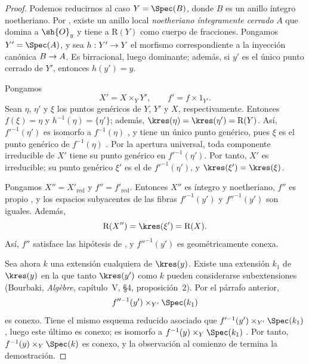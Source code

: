 \documentclass[oneside]{amsart}
\makeatletter
\newcommand{\ega@arrow}[2]{\mathchoice{#1}{#2}{#2}{#2}}
\renewcommand{\to}{\ega@arrow{\longrightarrow}{\rightarrow}}
\newcommand{\oldpage}[2][]{{\marginnote{\normalfont\textbf{#1}~|~#2}}\ignorespaces}
\makeatother
\begin{document}
\begin{proof}
Podemos reducirnos al caso $Y=\Spec(B)$, donde $B$ es un anillo
íntegro noetheriano. Por , existe un anillo local
\emph{noetheriano íntegramente cerrado} $A$ que domina a $\sh{O}_y$ y tiene a
$\mathrm{R}(Y)$ como cuerpo de fracciones. Pongamos $Y'=\Spec(A)$, y
sea $h:Y'\to Y$ el morfismo correspondiente a la inyección canónica
$B\to A$. Es birracional, luego dominante; además, si $y'$ es el
único punto cerrado de $Y'$, entonces $h(y')=y$.

Pongamos
\[
  X'=X\times_Y Y',
  \qquad
  f'=f\times 1_{Y'}.
\]
Sean $\eta$, $\eta'$ y $\xi$ los puntos genéricos de $Y$, $Y'$ y
$X$, respectivamente. Entonces $f(\xi)=\eta$ y
$h^{-1}(\eta)=\{\eta'\}$; además,
$\kres(\eta)=\kres(\eta')=\mathrm{R}(Y)$. Así, $f'^{-1}(\eta')$ es
isomorfo a $f^{-1}(\eta)$ , y tiene un único punto
genérico, pues $\xi$ es el punto genérico de
$f^{-1}(\eta)$ . Por la apertura universal, toda
componente irreducible de $X'$ tiene su punto genérico en
$f'^{-1}(\eta')$. Por tanto, $X'$ es irreducible; su punto genérico
$\xi'$ es el de $f'^{-1}(\eta')$, y
$\kres(\xi')=\kres(\xi)$.

\oldpage[III]{134}

Pongamos $X''=X'_{\mathrm{red}}$ y $f''=f'_{\mathrm{red}}$. Entonces
$X''$ es íntegro y noetheriano, $f''$ es propio
, y los espacios subyacentes de las fibras
$f'^{-1}(y')$ y $f''^{-1}(y')$ son iguales. Además,
\[
  \mathrm{R}(X'')=\kres(\xi')=\mathrm{R}(X).
\]
Así, $f''$ satisface las hipótesis de , y
$f''^{-1}(y')$ es geométricamente conexa.

Sea ahora $k$ una extensión cualquiera de $\kres(y)$. Existe una
extensión $k_1$ de $\kres(y)$ en la que tanto $\kres(y')$ como $k$
pueden considerarse subextensiones (Bourbaki, \emph{Alg\`ebre},
capítulo~V, \S4, proposición~2). Por el párrafo anterior,
\[
  f''^{-1}(y')\times_{Y'}\Spec(k_1)
\]
es conexo. Tiene el mismo esquema reducido asociado que
$f'^{-1}(y')\times_{Y'}\Spec(k_1)$
, luego este último es conexo; es isomorfo a
$f^{-1}(y)\times_Y\Spec(k_1)$ . Por tanto,
$f^{-1}(y)\times_Y\Spec(k)$ es conexo, y la observación al comienzo
de  termina la demostración.
\end{proof}
\end{document}
